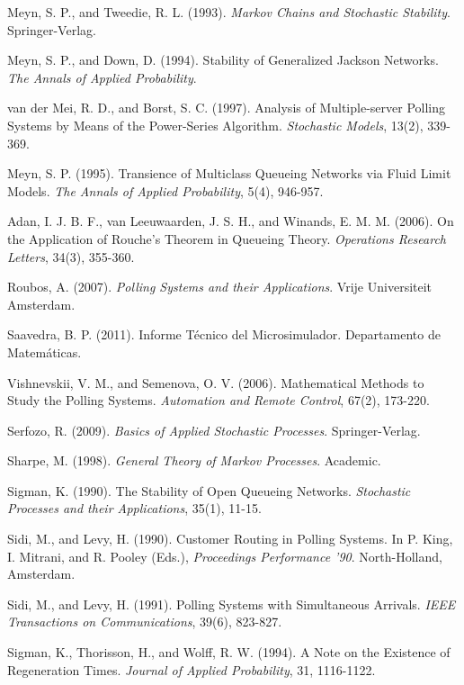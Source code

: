 \begin{thebibliography}{99}
 Meyn, S. P., and Tweedie, R. L. (1993). \textit{Markov Chains and Stochastic Stability}. Springer-Verlag.

 Meyn, S. P., and Down, D. (1994). Stability of Generalized Jackson Networks. \textit{The Annals of Applied Probability}.

 van der Mei, R. D., and Borst, S. C. (1997). Analysis of Multiple-server Polling Systems by Means of the Power-Series Algorithm. \textit{Stochastic Models}, 13(2), 339-369.

 Meyn, S. P. (1995). Transience of Multiclass Queueing Networks via Fluid Limit Models. \textit{The Annals of Applied Probability}, 5(4), 946-957.

 Adan, I. J. B. F., van Leeuwaarden, J. S. H., and Winands, E. M. M. (2006). On the Application of Rouche’s Theorem in Queueing Theory. \textit{Operations Research Letters}, 34(3), 355-360.

 Roubos, A. (2007). \textit{Polling Systems and their Applications}. Vrije Universiteit Amsterdam.

 Saavedra, B. P. (2011). Informe Técnico del Microsimulador. Departamento de Matemáticas.

 Vishnevskii, V. M., and Semenova, O. V. (2006). Mathematical Methods to Study the Polling Systems. \textit{Automation and Remote Control}, 67(2), 173-220.

 Serfozo, R. (2009). \textit{Basics of Applied Stochastic Processes}. Springer-Verlag.

 Sharpe, M. (1998). \textit{General Theory of Markov Processes}. Academic.

 Sigman, K. (1990). The Stability of Open Queueing Networks. \textit{Stochastic Processes and their Applications}, 35(1), 11-15.

 Sidi, M., and Levy, H. (1990). Customer Routing in Polling Systems. In P. King, I. Mitrani, and R. Pooley (Eds.), \textit{Proceedings Performance '90}. North-Holland, Amsterdam.

 Sidi, M., and Levy, H. (1991). Polling Systems with Simultaneous Arrivals. \textit{IEEE Transactions on Communications}, 39(6), 823-827.

 Sigman, K., Thorisson, H., and Wolff, R. W. (1994). A Note on the Existence of Regeneration Times. \textit{Journal of Applied Probability}, 31, 1116-1122.


\end{thebibliography}
